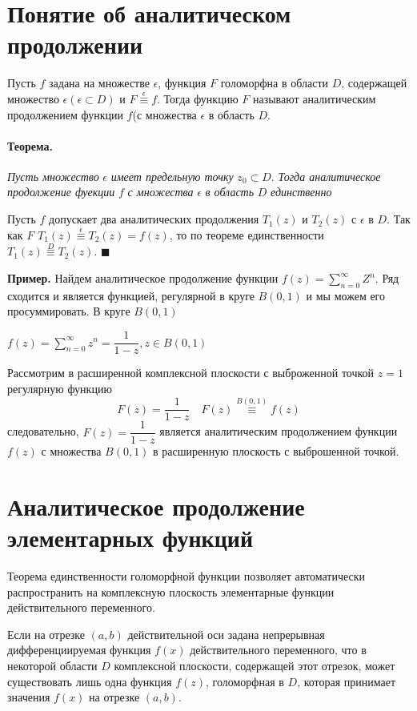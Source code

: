 \documentclass[a4paper, 12pt]{report}
\newenvironment{Proof}
{\par\noindent{\bf Доказательство.}}
{\hfill$\scriptstyle\blacksquare$}
\begin{document}
\section{Понятие об аналитическом продолжении}
Пусть  $f$ задана на множестве $\epsilon$, функция $F$ голоморфна в области $D$, содержащей множество $\epsilon(\epsilon\subset  D)$ и $F \stackrel{\epsilon}{\equiv} f.$
Тогда функцию $F$ называют аналитическим продолжением функции $f$(с множества $\epsilon$ в область $D$.
\paragraph*{Теорема.}
\textit{Пусть множество} $\epsilon$ \textit{имеет предельную точку} $z_0\subset D$. \textit{Тогда аналитическое продолжение фуекции} $f$ \textit{с множества} $\epsilon$ \textit{в область} $D$ \textit{единственно}
\bigskip
\begin{Proof}
    Пусть $f$ допускает два аналитических продолжения $T_1(z)$ и $T_2(z)$ с ${\epsilon}$ в $D.$ Так как $F$ $T_1(z)\stackrel{\epsilon}{\equiv}T_2(z) = f(z)$, то по теореме единственности $T_1(z)\stackrel{D}{\equiv}T_2(z).$
\end{Proof}

\par\bigskip

\textbf{Пример.} \quad Найдем аналитическое продолжение функции $f(z)=\sum\limits_{n=0}^{\infty}Z^n.$
Ряд сходится и является функцией, регулярной в круге $B(0,1)$ и мы можем его просуммировать. В круге $B(0,1)$

$f(z)=\sum\limits_{n=0}^{\infty}z^n=\dfrac{1}{1-z},z\in B(0,1)$

Рассмотрим в расширенной комплексной плоскости с выброженной точкой $z=1$ регулярную функцию $$F(z)=\dfrac{1}{1-z}\quad F(z)\stackrel{B(0,1)}{\equiv}f(z)$$ следовательно, $F(z)=\dfrac{1}{1-z}$ является аналитическим продолжением функции $f(z)$ с множества $B(0,1)$ в расширенную плоскость с выброшенной точкой.



\section{Аналитическое продолжение элементарных функций}

Теорема единственности голоморфной функции позволяет автоматически распространить на комплексную плоскость элементарные функции действительного переменного.

Если на отрезке $(a,b)$ действительной оси задана непрерывная дифференциируемая функция $f(x)$ действительного переменного, что в некоторой области $D$ комплексной плоскости, содержащей этот отрезок, может существовать лишь одна функция $f(z)$, голоморфная в $D$, которая принимает значения $f(x)$ на отрезке $(a,b).$
\end{document}

